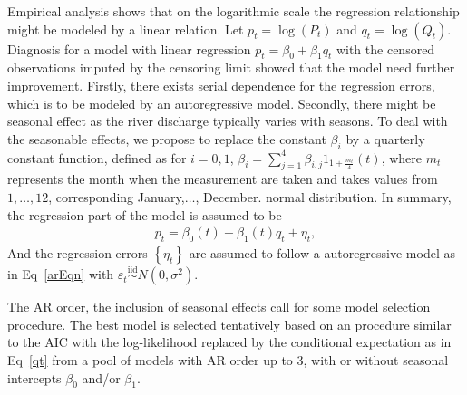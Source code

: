 \documentclass[a4paper,12pt]{article}
\def \iid {\stackrel{\mathrm{iid}}{\sim}}
\begin{document}
Empirical analysis shows that on the logarithmic scale the regression relationship might be modeled
by a linear relation. Let $p_t = \log(P_t)$ and $q_t =
\log(Q_t)$. Diagnosis for a model with linear regression $p_t = \beta_0 + \beta_1 q_t$ with the
censored observations imputed by the censoring limit showed that the model need further
improvement. Firstly, there exists serial dependence for the regression errors, which is to be 
modeled by an autoregressive model. Secondly, there might be seasonal effect as the river discharge
typically varies with seasons. To deal with the seasonable effects, we propose to replace the
constant $\beta_i$ by a quarterly constant function, defined as
for $i=0,1$, $\beta_{i} = \sum_{j=1}^4\beta_{i,j}1_{1+\frac{m_t}{4}}(t)$, where $m_t$ 
represents the month when the measurement are taken and takes values from $1,\dots,12$,
corresponding January,$\dots$, December.
normal distribution.
In summary, the
regression part of the model is assumed to be
\begin{align*}
p_t = \beta_{0}(t) + \beta_{1}(t) q_t + \eta_t,  %
\end{align*}
And the regression errors $\left\{ \eta_t \right\}$ are assumed to follow a autoregressive model as
in Eq~\eqref{arEqn} with $\varepsilon_t \iid N(0,\sigma^2)$.

The AR order, the inclusion of seasonal effects call for some model
selection procedure. The best model is selected tentatively based on an procedure similar to the AIC
with the log-likelihood replaced by the conditional expectation as in Eq~\eqref{qt} from a pool of
models with AR order up to 3, with or without seasonal intercepts $\beta_0$ and/or $\beta_1$. %
\end{document}
